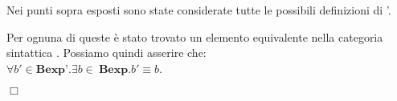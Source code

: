 {\begin{enumerate}[label=(\alph*)]
\begin{itemize}
  \end{itemize}
\end{enumerate}

Nei punti sopra esposti sono state considerate tutte le possibili definizioni
di \bexp'.

Per ognuna di queste è stato trovato un elemento equivalente nella
categoria sintattica \bexp. Possiamo quindi asserire che: \\

$\forall b' \in \textbf{Bexp'}.\exists b \in \ \textbf{Bexp}.b' \equiv b$.

\begin{flushright}
$\Box$
\end{flushright}
}